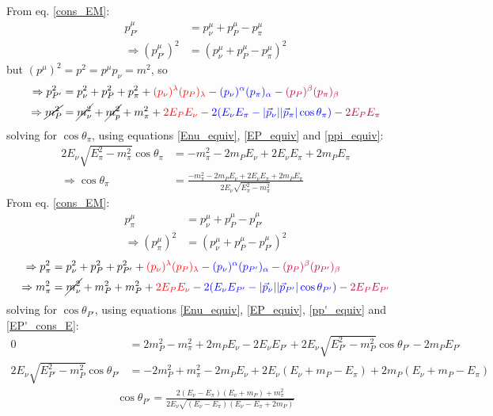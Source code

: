 \documentclass[]{article}
\numberwithin{equation}{section}
\newcommand{\0}{\textcolor{gray}{0}}
\begin{document}
From eq. \ref{cons_EM}:
\begin{align*}
	p^\mu_{P'} &= p^\mu_\nu + p^\mu_P - p^\mu_\pi\\
	\Rightarrow (p^\mu_{P'})^2 &= (p^\mu_\nu + p^\mu_P - p^\mu_\pi)^2
\end{align*}
but \((p^\mu)^2 = p^2 = p^\mu p_\nu = m^2\), so
\begin{align*}
	\Rightarrow p_{P'}^2 &= p_\nu^2 + p_P^2 + p_\pi^2 + \textcolor{red}{(p_\nu)^\lambda (p_P)_\lambda} - \textcolor{blue}{(p_\nu)^\alpha (p_\pi)_\alpha} - \textcolor{purple}{(p_P)^\beta (p_\pi)_\beta}\\
	\Rightarrow \cancel{m_P^2} &= \cancel{m_\nu^2} + \cancel{m_p^2} + m_\pi^2 +\textcolor{red}{2 E_P E_\nu} - \textcolor{blue}{2(E_\nu E_\pi - |\vec{p}_\nu| |\vec{p}_\pi|\cos\theta_{\pi})} - \textcolor{purple}{2E_P E_\pi}
\end{align*}
solving for \(\cos\theta_\pi\), using equations \ref{Enu_equiv}, \ref{EP_equiv} and \ref{ppi_equiv}:
\begin{align*}
	2 E_\nu \sqrt{E_\pi^2  - m_\pi^2} \cos\theta_\pi &= - m_\pi^2 - 2m_P E_\nu + 2E_\nu E_\pi + 2m_P E_\pi\\
	\Rightarrow \cos\theta_\pi &= \frac{- m_\pi^2 - 2m_P E_\nu + 2E_\nu E_\pi + 2m_P E_\pi}{2 E_\nu \sqrt{E_\pi^2  - m_\pi^2} }
\end{align*}
From eq. \ref{cons_EM}:
\begin{align*}
p^\mu_\pi &= p^\mu_\nu + p^\mu_P - p^\mu_{P'}\\
\Rightarrow (p^\mu_\pi)^2 &= (p^\mu_\nu + p^\mu_P - p^\mu_{P'})^2
\end{align*}
\begin{align*}
\Rightarrow p_\pi^2 &= p_\nu^2 + p_P^2 + p_{P'}^2 + \textcolor{red}{(p_\nu)^\lambda (p_P)_\lambda} - \textcolor{blue}{(p_\nu)^\alpha (p_{P'})_\alpha} - \textcolor{purple}{(p_P)^\beta (p_{P'})_\beta}\\
\Rightarrow m_\pi^2 &= \cancel{m_\nu^2} + m_P^2 + m_P^2 +\textcolor{red}{2 E_P E_\nu} - \textcolor{blue}{2(E_\nu E_{P'} - |\vec{p}_\nu| |\vec{p}_{P'}|\cos\theta_{P'})} - \textcolor{purple}{2 E_P E_{P'}}
\end{align*}
solving for \(\cos\theta_{P'}\), using equations \ref{Enu_equiv}, \ref{EP_equiv}, \ref{pp'_equiv} and \ref{EP'_cons_E}:
\begin{align*}
0 &= 2m_P^2 - m_\pi^2 + 2 m_P E_\nu - 2 E_\nu E_{P'} + 2 E_\nu \sqrt{E_{P'}^2 - m_P^2} \cos\theta_{P'} - 2 m_P E_{P'}\\
2 E_\nu \sqrt{E_{P'}^2 - m_P^2} \cos\theta_{P'} &= - 2 m_P^2 + m_\pi^2 - 2 m_P E_\nu + 2 E_\nu (E_\nu + m_P - E_\pi) + 2 m_P (E_\nu + m_P - E_\pi)
\end{align*}
\begin{align*}
	\cos\theta_{P'} = \frac{2 (E_\nu - E_\pi) (E_\nu + m_P) + m_\pi^2}{2 E_\nu \sqrt{(E_\nu - E_\pi) (E_\nu - E_\pi + 2 m_P)}}
\end{align*}
\end{document}
